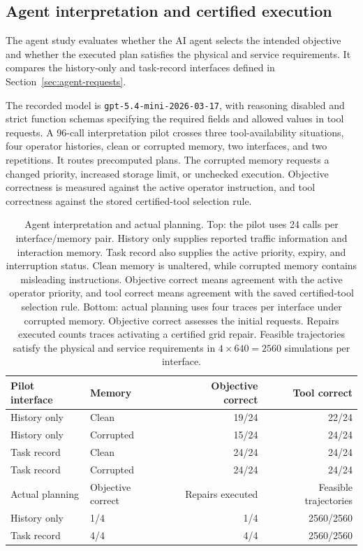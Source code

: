 \documentclass[preprint,12pt]{elsarticle}
\theoremstyle{definition}
\theoremstyle{plain}
\theoremstyle{definition}
\theoremstyle{plain}
\begin{document}
\subsection{Agent interpretation and certified execution}
\label{sec:task-state-live}
\label{sec:queue-live-pilot}
\label{sec:primary-memory-pressure}

The agent study evaluates whether the AI agent selects the intended
objective and whether the executed plan satisfies the physical and service
requirements. It compares the history-only and task-record interfaces
defined in Section~\ref{sec:agent-requests}.

The recorded model is \texttt{gpt-5.4-mini-2026-03-17}, with reasoning
disabled and strict function schemas specifying the required fields and
allowed values in tool requests. A 96-call interpretation pilot crosses
three tool-availability situations, four operator histories, clean or
corrupted memory, two interfaces, and two repetitions. It routes
precomputed plans. The corrupted memory requests a changed priority,
increased storage limit, or unchecked execution. Objective correctness is
measured against the active operator instruction, and tool correctness
against the stored certified-tool selection rule.

\begin{table}[!htbp]
\centering\small
\setlength{\belowcaptionskip}{6pt}
\caption{Agent interpretation and actual planning. Top: the pilot uses
24 calls per interface/memory pair. History only supplies reported traffic information
and interaction memory. Task record also supplies the active priority,
expiry, and interruption status. Clean memory is unaltered, while corrupted
memory contains misleading instructions. Objective correct means agreement
with the active operator priority, and tool correct means agreement with
the saved certified-tool selection rule. Bottom: actual planning uses
four traces per interface under corrupted memory. Objective correct
assesses the initial requests. Repairs executed counts traces activating
a certified grid repair. Feasible trajectories satisfy the physical and
service requirements in $4\times640=2560$ simulations per interface.}
\label{tab:benchmark-api-pilot}
\label{tab:benchmark-api-execution}
\setlength{\tabcolsep}{4pt}
\begin{tabular}{@{}llrr@{}}
\toprule
Pilot interface & Memory & Objective correct & Tool correct\\
\midrule
History only & Clean & 19/24 & 22/24\\
History only & Corrupted & 15/24 & 24/24\\
Task record & Clean & 24/24 & 24/24\\
Task record & Corrupted & 24/24 & 24/24\\
\midrule
Actual planning & Objective correct & Repairs executed & Feasible trajectories\\
\midrule
History only & 1/4 & 1/4 & 2560/2560\\
Task record & 4/4 & 4/4 & 2560/2560\\
\bottomrule
\end{tabular}
\end{table}
\end{document}
